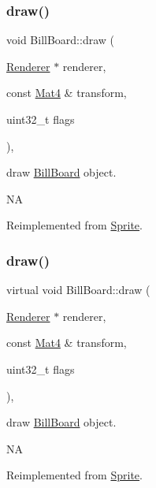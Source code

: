 \subsubsection{\texorpdfstring{draw()}{draw()}\hspace{0.1cm}{\footnotesize\ttfamily [1/2]}}
{\footnotesize\ttfamily void Bill\+Board\+::draw (\begin{DoxyParamCaption}\item[{\hyperlink{classRenderer}{Renderer} $\ast$}]{renderer,  }\item[{const \hyperlink{classMat4}{Mat4} \&}]{transform,  }\item[{uint32\+\_\+t}]{flags }\end{DoxyParamCaption})\hspace{0.3cm}{\ttfamily [override]}, {\ttfamily [virtual]}}

draw \hyperlink{classBillBoard}{Bill\+Board} object.

NA 

Reimplemented from \hyperlink{classSprite_a033c570c383dbab72ca2bc9ccdffb3b9}{Sprite}.

\mbox{\label{classBillBoard_a61816c66a9b5dbfbe12cf1bd747f5229}} 
\subsubsection{\texorpdfstring{draw()}{draw()}\hspace{0.1cm}{\footnotesize\ttfamily [2/2]}}
{\footnotesize\ttfamily virtual void Bill\+Board\+::draw (\begin{DoxyParamCaption}\item[{\hyperlink{classRenderer}{Renderer} $\ast$}]{renderer,  }\item[{const \hyperlink{classMat4}{Mat4} \&}]{transform,  }\item[{uint32\+\_\+t}]{flags }\end{DoxyParamCaption})\hspace{0.3cm}{\ttfamily [override]}, {\ttfamily [virtual]}}

draw \hyperlink{classBillBoard}{Bill\+Board} object.

NA 

Reimplemented from \hyperlink{classSprite_a033c570c383dbab72ca2bc9ccdffb3b9}{Sprite}.

\mbox{\label{classBillBoard_a7fbd2c7bda64d7799789954d8d316b25}} 
